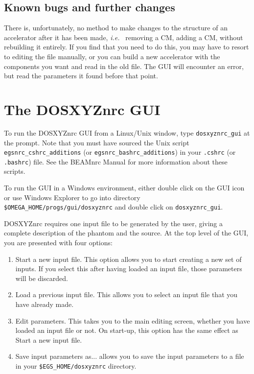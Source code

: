\documentclass[12pt,twoside]{article}
\newcommand{\ie}{{\em i.e.}}
\begin{document}
\subsection{Known bugs and further changes}

There is, unfortunately, no method to make changes to the structure
of an accelerator after it has been made, \ie~ removing a CM, adding a
CM, without rebuilding it entirely.  If you find that you need to do
this, you may have to resort to editing the file manually, or you can build a new
accelerator with the components you want and read in the old file.  The
GUI will encounter an error, but
read the parameters it found before that point.


\section{The DOSXYZnrc GUI}

To run the DOSXYZnrc GUI from a Linux/Unix window, type {\tt dosxyznrc\_gui}
at the prompt. Note that you must have sourced the Unix script
{\tt egsnrc\_cshrc\_additions} (or {\tt egsnrc\_bashrc\_additions}) in
your {\tt .cshrc} (or {\tt .bashrc}) file.  See the BEAMnrc Manual\cite{Ro04a}
for more information about these scripts.

To run the GUI in a Windows environment, either double click on
the GUI icon or use Windows Explorer to go into directory
{\tt \$OMEGA\_HOME/progs/gui/dosxyznrc} and double click on
{\tt dosxyznrc\_gui}.

DOSXYZnrc requires one input file to be generated by the user, giving a
complete description of the phantom and the source.  At the top level of
the GUI, you are presented with four options:
\begin{enumerate}
\item {\sf Start a new input file}.  This option allows you to start
creating a new set of inputs.  If you select this after having loaded an
input file, those parameters will be discarded.
\item {\sf Load a previous input file}.  This allows you
to select an input file that you have already made.
\item {\sf Edit parameters}.  This takes you to the main editing screen,
whether you
have loaded an input file or not.  On start-up, this option has the same
effect as {\sf Start a new input file}.
\item {\sf Save input parameters as...} allows you to save the input parameters
to a file in your {\tt \$EGS\_HOME/dosxyznrc} directory.

\end{enumerate}
\end{document}
